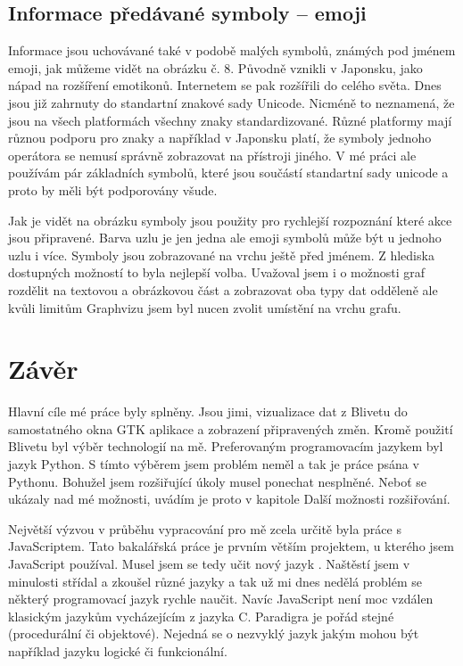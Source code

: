 \documentclass[color,table,oneside,nolot,nolof]{fithesis}
\begin{document}
\section{Informace předávané symboly -- emoji}
  Informace jsou uchovávané také v podobě malých symbolů, známých pod jménem emoji, jak můžeme vidět na obrázku č. 8.
	Původně vznikli v Japonsku, jako nápad na rozšíření emotikonů. Internetem se pak rozšířili do
	celého světa. Dnes jsou již zahrnuty do standartní znakové sady Unicode. Nicméně to neznamená, že jsou na všech platformách všechny znaky standardizované. Různé platformy mají různou
	podporu pro znaky a například v Japonsku platí, že symboly jednoho operátora se nemusí správně zobrazovat na přístroji jiného. V mé práci ale používám pár základních symbolů, které 
	jsou součástí standartní sady unicode a proto by měli být podporovány všude.

  Jak je vidět na obrázku symboly jsou použity pro rychlejší rozpoznání které akce jsou připravené. Barva uzlu je jen jedna ale emoji symbolů může být u jednoho uzlu i více. Symboly jsou
	zobrazované na vrchu ještě před jménem. Z hlediska dostupných možností to byla nejlepší volba. Uvažoval jsem i o možnosti graf rozdělit na textovou a obrázkovou část a zobrazovat
	oba typy dat odděleně ale kvůli limitům Graphvizu jsem byl nucen zvolit umístění na vrchu grafu.

\chapter{Závěr}
  Hlavní cíle mé práce byly splněny. Jsou jimi, vizualizace dat z Blivetu do samostatného okna GTK aplikace a zobrazení připravených změn. Kromě použití Blivetu byl
	výběr technologií na mě. Preferovaným programovacím jazykem byl jazyk Python. S tímto výběrem jsem problém neměl a tak je práce psána v Pythonu. Bohužel jsem rozšiřující úkoly musel
	ponechat nesplněné. Neboť se ukázaly nad mé možnosti, uvádím je proto v kapitole Další možnosti rozšiřování.

	Největší výzvou v průběhu vypracování pro mě zcela určitě byla práce s JavaScriptem. Tato bakalářská práce je prvním větším projektem, u kterého jsem JavaScript používal. Musel jsem se
	tedy učit nový jazyk . Naštěstí jsem v minulosti střídal a zkoušel různé jazyky a tak už mi dnes nedělá problém se některý programovací jazyk rychle naučit. Navíc 
	JavaScript není moc vzdálen klasickým jazykům vycházejícím z jazyka C. Paradigra je pořád stejné (procedurální či objektové). Nejedná se o nezvyklý jazyk jakým mohou být například
	jazyku logické či funkcionální.
\end{document}

